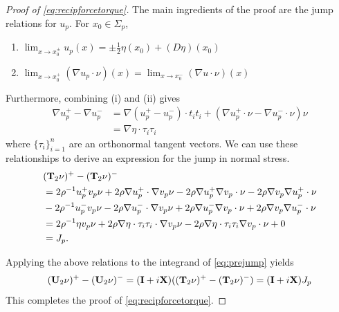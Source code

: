 \documentclass[lineno]{jfm}
\begin{document}
\begin{proof}[Proof of \eqref{eq:recipforcetorque}]
  The main ingredients of the proof are the jump relations
  for $u_p$. For $x_0 \in \Sigma_p$,
  \begin{enumerate}
  \item $ \lim_{x \to x_0^\pm } u_p(x) = \pm\frac{1}{2}\eta(x_0) + (D\eta)(x_0)$
  \item $ \lim_{x \to x_0^+ } (\nabla u_p \cdot \nu) (x) = \lim_{x \to x_0^-} (\nabla u \cdot \nu)(x)$
  \end{enumerate}
  Furthermore,
  combining (i) and (ii) gives
  \begin{align*}
    \nabla u_p^+ - \nabla u_p^-
    &= \nabla (u_p^+ - u_p^-) \cdot t_i t_i +  (\nabla  u_p^+\cdot \nu  - \nabla u_p^- \cdot \nu) \nu\\
    &= \nabla \eta \cdot \tau_i \tau_i
  \end{align*}
  where $\{\tau_i\}_{i=1}^n$ are an orthonormal tangent vectors.
  We can use these relationships to derive an expression for the jump in
  normal stress.
  \begin{align*}
    &({\bf T}_2\nu)^+ - ({\bf T}_2\nu)^-
    \\
    &= 2\rho^{-1} u_p^+v_p \nu + 2\rho \nabla u_p^+ \cdot \nabla v_p \nu
    - 2 \rho \nabla u_p^+  \nabla v_p \cdot \nu
    - 2 \rho \nabla v_p  \nabla u_p^+ \cdot \nu\\
    &-2\rho^{-1} u_p^-v_p \nu - 2\rho \nabla u_p^- \cdot \nabla v_p \nu
    + 2 \rho \nabla u_p^-  \nabla v_p \cdot \nu
    + 2 \rho \nabla v_p  \nabla u_p^- \cdot \nu\\
    &= 2\rho^{-1} \eta v_p \nu + 2\rho \nabla \eta \cdot \tau_i \tau_i \cdot \nabla v_p \nu
    - 2\rho \nabla \eta \cdot \tau_i \tau_i \nabla v_p \cdot \nu + 0\\
    &= J_p.
  \end{align*}

  Applying the above relations to the integrand of \eqref{eq:prejump} yields
  \[
  ({\bf U}_2\nu)^+ - ({\bf U}_2\nu)^-
  =
  ({\bf I} + i {\bf X})(({\bf T}_2\nu)^+ - ({\bf T}_2\nu)^-)
  = ({\bf I} + i {\bf X})J_p
  \]
  This completes the proof of \eqref{eq:recipforcetorque}.
\end{proof}

%





%
%
\end{document}
